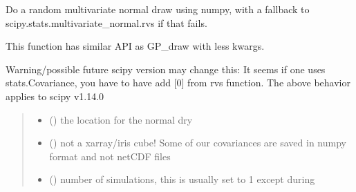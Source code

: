 \documentclass[letterpaper,10pt,english]{sphinxmanual}
\begin{document}

\begin{fulllineitems}
\label{\detokenize{kriging:glomar_gridding.stochastic.draw_from_cov}}
\pysigstartsignatures
\pysiglinewithargsret
{}
{\sphinxparamcomma {}\sphinxparamcomma {}\sphinxparamcomma {}\sphinxparamcomma {}\sphinxparamcomma {}}
{}
\pysigstopsignatures
\sphinxAtStartPar
Do a random multivariate normal draw using numpy, with a fallback to
scipy.stats.multivariate\_normal.rvs if that fails.

\sphinxAtStartPar
This function has similar API as GP\_draw with less kwargs.

\sphinxAtStartPar
Warning/possible future scipy version may change this:
It seems if one uses stats.Covariance, you have to have add {[}0{]} from rvs
function. The above behavior applies to scipy v1.14.0
\begin{quote}\begin{description}
\begin{itemize}
\item {}
\sphinxAtStartPar
{} () \textendash{} the location for the normal dry

\item {}
\sphinxAtStartPar
{} () \textendash{} not a xarray/iris cube! Some of our covariances are saved in numpy
format and not netCDF files

\item {}
\sphinxAtStartPar
{} () \textendash{} number of simulations, this is usually set to 1 except during


\end{itemize}
\end{description}
\end{quote}
\end{fulllineitems}
\end{document}
